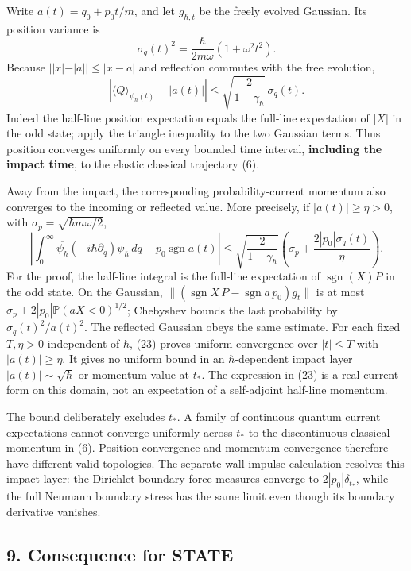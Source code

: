 \documentclass[11pt,a4paper]{article}
\begin{document}
Write \(a(t)=q_0+p_0t/m\), and let \(g_{\hbar,t}\) be the freely evolved
Gaussian. Its position variance is
\[\sigma_q(t)^2=\frac{\hbar}{2m\omega}(1+\omega^2t^2).\tag{21}\] Because
\(||x|-|a||\le|x-a|\) and reflection commutes with the free evolution,
\[
 \left|\langle Q\rangle_{\psi_\hbar(t)}-|a(t)|\right|
 \le\sqrt{\frac{2}{1-\gamma_\hbar}}\,\sigma_q(t).\tag{22}
\] Indeed the half-line position expectation equals the full-line
expectation of \(|X|\) in the odd state; apply the triangle inequality
to the two Gaussian terms. Thus position converges uniformly on every
bounded time interval, \textbf{including the impact time}, to the
elastic classical trajectory (6).

Away from the impact, the corresponding probability-current momentum
also converges to the incoming or reflected value. More precisely, if
\(|a(t)|\ge\eta>0\), with \(\sigma_p=\sqrt{\hbar m\omega/2}\), \[
 \left|\int_0^\infty\overline{\psi_\hbar}
             (-i\hbar\partial_q)\psi_\hbar\,dq
       -p_0\operatorname{sgn}a(t)\right|
 \le\sqrt{\frac2{1-\gamma_\hbar}}
      \left(\sigma_p+\frac{2|p_0|\sigma_q(t)}{\eta}\right).\tag{23}
\] For the proof, the half-line integral is the full-line expectation of
\(\operatorname{sgn}(X)P\) in the odd state. On the Gaussian,
\(\|(\operatorname{sgn}X\,P-\operatorname{sgn}a\,p_0)g_t\|\) is at most
\(\sigma_p+2|p_0|\mathbb P(aX<0)^{1/2}\); Chebyshev bounds the last
probability by \(\sigma_q(t)^2/a(t)^2\). The reflected Gaussian obeys
the same estimate. For each fixed \(T,\eta>0\) independent of \(\hbar\),
(23) proves uniform convergence over \(|t|\le T\) with
\(|a(t)|\ge\eta\). It gives no uniform bound in an \(\hbar\)-dependent
impact layer \(|a(t)|\sim\sqrt\hbar\) or momentum value at \(t_*\). The
expression in (23) is a real current form on this domain, not an
expectation of a self-adjoint half-line momentum.

The bound deliberately excludes \(t_*\). A family of continuous quantum
current expectations cannot converge uniformly across \(t_*\) to the
discontinuous classical momentum in (6). Position convergence and
momentum convergence therefore have different valid topologies. The
separate \href{dirichlet-wall-impulse.md}{wall-impulse calculation}
resolves this impact layer: the Dirichlet boundary-force measures
converge to \(2|p_0|\delta_{t_*}\), while the full Neumann boundary
stress has the same limit even though its boundary derivative vanishes.

\hypertarget{consequence-for-state}{%
\subsection{9. Consequence for STATE}\label{consequence-for-state}}
\end{document}
